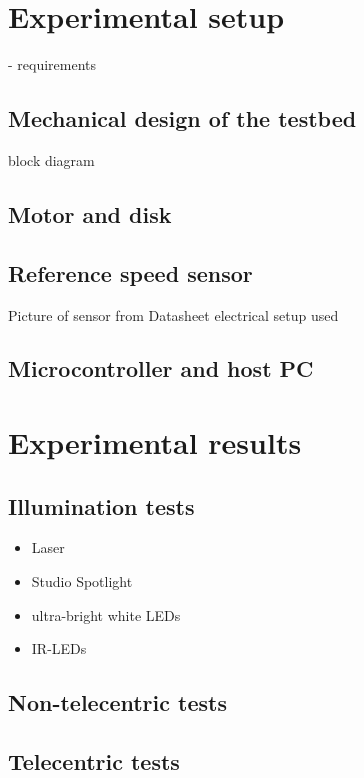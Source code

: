\documentclass[12pt,a4paper]{article}
\begin{document}
\section{Experimental setup}

- requirements

\subsection{Mechanical design of the testbed}

block diagram

\subsection{Motor and disk}

\subsection{Reference speed sensor}
      Picture of sensor from Datasheet
      electrical setup used

\subsection{Microcontroller and host PC}      

\clearpage
\section{Experimental results}

\subsection{Illumination tests}

\begin{itemize}
  \item Laser
  \item Studio Spotlight
  \item ultra-bright white LEDs
  \item IR-LEDs
\end{itemize}

\subsection{Non-telecentric tests}

\subsection{Telecentric tests}
\end{document}
